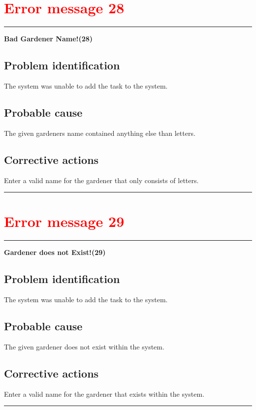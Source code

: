 \section{\textbf{\textcolor{red}{Error message 28}}}
\hrule
\vspace{0.5cm}
\textbf{Bad Gardener Name!(28)}
\subsection{Problem identification}
The system was unable to add the task to the system.

\subsection{Probable cause}
The given gardeners name contained anything else than letters.

\subsection{Corrective actions}
Enter a valid name for the gardener that only consists of letters.
\vspace{0.5cm}
\hrule
\hfill
\break


\section{\textbf{\textcolor{red}{Error message 29}}}
\hrule
\vspace{0.5cm}
\textbf{Gardener does not Exist!(29)}
\subsection{Problem identification}
The system was unable to add the task to the system.

\subsection{Probable cause}
The given gardener does not exist within the system.

\subsection{Corrective actions}
Enter a valid name for the gardener that exists within the system.
\vspace{0.5cm}
\hrule
\hfill
